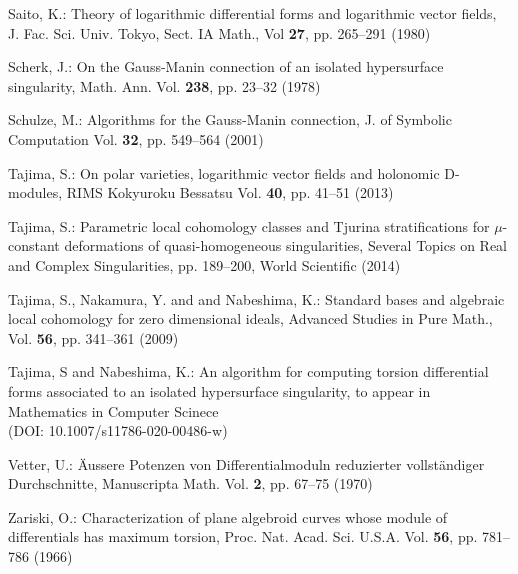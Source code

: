 \documentclass[pdftex]{arxsigma}
\begin{document}
\begin{thebibliography}{99}
Saito, K.:
\newblock Theory of logarithmic differential forms and logarithmic vector fields,
\newblock J. Fac. Sci. Univ. Tokyo, Sect. IA Math., 
Vol \textbf{27}, pp. 265--291 (1980)


Scherk, J.:
\newblock On the Gauss-Manin connection of an isolated hypersurface singularity, 
\newblock Math. Ann. 
Vol. {\bf 238}, pp. 23--32 (1978)


Schulze, M.:
\newblock Algorithms for the Gauss-Manin connection, 
\newblock J. of Symbolic Computation 
Vol. {\bf 32}, pp. 549--564 (2001)


Tajima, S.:
\newblock  On polar varieties, logarithmic vector fields and holonomic D-modules, 
\newblock RIMS Kokyuroku Bessatsu 
Vol. {\bf 40}, pp.  41--51 (2013)


Tajima, S.:
\newblock Parametric local cohomology classes and Tjurina stratifications for $ \mu$-constant deformations of 
quasi-homogeneous singularities,  
\newblock Several Topics on Real and Complex Singularities, 
pp. 189--200, World Scientific (2014)


Tajima, S., Nakamura, Y. and  and Nabeshima, K.:
\newblock Standard bases and algebraic local cohomology for zero dimensional ideals, 
\newblock Advanced Studies in Pure Math., 
Vol. {\bf 56}, pp. 341--361 (2009)



Tajima, S  and Nabeshima, K.: 
\newblock An algorithm for computing torsion differential forms associated to 
an isolated hypersurface singularity, 
\newblock to appear in Mathematics in Computer Scinece \\
(DOI: 10.1007/s11786-020-00486-w)

Vetter, U.:
\newblock \"Aussere Potenzen von Differentialmoduln reduzierter vollst\"andiger Durchschnitte, 
\newblock Manuscripta Math.
Vol. {\bf 2}, pp. 67--75 (1970)

Zariski, O.: 
\newblock Characterization of plane algebroid curves whose module of differentials has maximum torsion, 
\newblock Proc. Nat. Acad. Sci. U.S.A. 
Vol. {\bf 56}, pp. 781--786 (1966)


\end{thebibliography}\LastPageEnding
\end{document}
